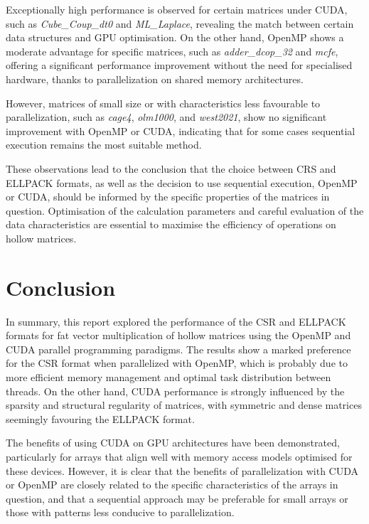\documentclass[12pt,oneside]{book} %
\begin{document}
Exceptionally high performance is observed for certain matrices under CUDA,
such as \textit{Cube\_Coup\_dt0} and \textit{ML\_Laplace}, revealing the match
between certain data structures and GPU optimisation. On the other hand, OpenMP
shows a moderate advantage for specific matrices, such as
\textit{adder\_dcop\_32} and \textit{mcfe}, offering a significant performance
improvement without the need for specialised hardware, thanks to
parallelization on shared memory architectures.

However, matrices of small size or with characteristics less favourable to
parallelization, such as \textit{cage4}, \textit{olm1000}, and
\textit{west2021}, show no significant improvement with OpenMP or CUDA,
indicating that for some cases sequential execution remains the most suitable
method.

These observations lead to the conclusion that the choice between CRS and
ELLPACK formats, as well as the decision to use sequential execution, OpenMP or
CUDA, should be informed by the specific properties of the matrices in
question. Optimisation of the calculation parameters and careful evaluation of
the data characteristics are essential to maximise the efficiency of operations
on hollow matrices.

\chapter{Conclusion}

In summary, this report explored the performance of the CSR and ELLPACK formats
for fat vector multiplication of hollow matrices using the OpenMP and CUDA
parallel programming paradigms. The results show a marked preference for the
CSR format when parallelized with OpenMP, which is probably due to more
efficient memory management and optimal task distribution between threads. On
the other hand, CUDA performance is strongly influenced by the sparsity and
structural regularity of matrices, with symmetric and dense matrices seemingly
favouring the ELLPACK format.

The benefits of using CUDA on GPU architectures have been demonstrated,
particularly for arrays that align well with memory access models optimised for
these devices. However, it is clear that the benefits of parallelization with
CUDA or OpenMP are closely related to the specific characteristics of the
arrays in question, and that a sequential approach may be preferable for small
arrays or those with patterns less conducive to parallelization.
\end{document}
